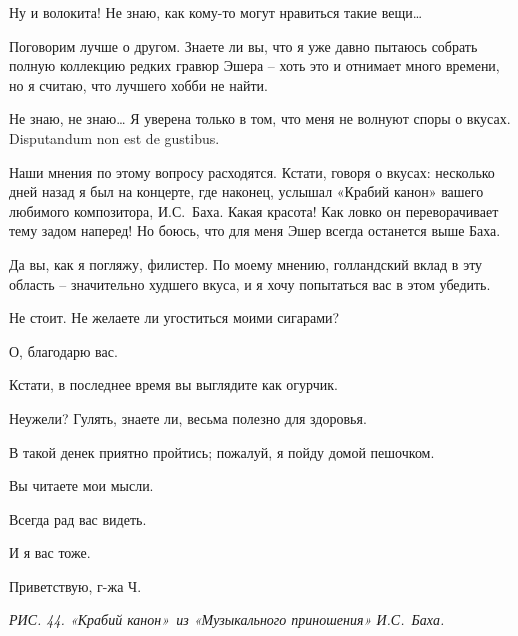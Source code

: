 \documentclass[../main.tex]{subfiles}
\begin{document}
\begin{Dialogue}
 Ну и волокита! Не знаю, как кому-то могут нравиться такие вещи\ldots{}

 Поговорим лучше о другом. Знаете ли вы, что я уже давно пытаюсь собрать полную коллекцию редких гравюр Эшера \--- хоть это и отнимает много времени, но я считаю, что лучшего хобби не найти.

 Не знаю, не знаю\ldots{} Я уверена только в том, что меня не волнуют споры о вкусах. Disputandum non est de gustibus.

 Наши мнения по этому вопросу расходятся. Кстати, говоря о вкусах: несколько дней назад я был на концерте, где наконец, услышал «Крабий канон» вашего любимого композитора, И.С.~Баха. Какая красота! Как ловко он переворачивает тему задом наперед! Но боюсь, что для меня Эшер всегда останется выше Баха.

 Да вы, как я погляжу, филистер. По моему мнению, голландский вклад в эту область \--- значительно худшего вкуса, и я хочу попытаться вас в этом убедить.

 Не стоит. Не желаете ли угоститься моими сигарами?

 О, благодарю вас.

 Кстати, в последнее время вы выглядите как огурчик.

 Неужели? Гулять, знаете ли, весьма полезно для здоровья.

 В такой денек приятно пройтись; пожалуй, я пойду домой пешочком.

 Вы читаете мои мысли.

 Всегда рад вас видеть.

 И я вас тоже.

 Приветствую, г-жа Ч.

\emph{РИС. 44. «Крабий канон»~из «Музыкального приношения» И.С.~Баха.}

\end{Dialogue}
\end{document}
